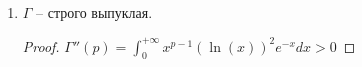 \begin{properties}
\begin{enumerate}
{            \begin{proof}
                Надо обосновать дифф. под знаком интеграла. Для этого надо потребовать равномерную сх-ть полученного интеграла.
                
                $0 < a \leq p \leq b < +\infty$
                
                \begin{enumerate}
                    \item {
                        $0 \leq x \leq 1$:

                        $x^{a-1} |\ln(x)|^{n} e^{-x}$
                    }
                    \item {
                        $1 \leq x$:

                        $x^{b-1} |\ln(x)|^{n} e^{-x} \leq x^{n + b} e^{-x}$
                    }
                \end{enumerate}
            \end{proof}
        }
        \item {
            $\Gamma$ -- строго выпуклая.

            \begin{proof}
                $\Gamma''(p) = \int_{0}^{+\infty} { x^{p-1} (\ln(x))^2 e^{-x} dx } > 0$
            \end{proof}
        }
    \end{enumerate}
\end{properties}

